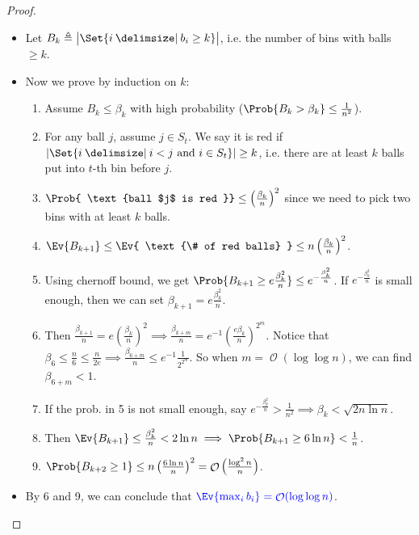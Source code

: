 \documentclass[a4paper]{article}
\DeclarePairedDelimiter{\abs}{\lvert}{\rvert}
\DeclareMathOperator{\Ord}{\mathcal{O}}
\providecommand\given{}
\newcommand*\SetSymbol[1][]{%
  \nonscript\:#1\vert
  \allowbreak
  \nonscript\:
\mathopen{}}
\renewcommand\given{\SetSymbol[\delimsize]}
\renewcommand\given{\SetSymbol[\delimsize]}
\theoremstyle{mystyle}
\begin{document}
\begin{proof} \mbox{}
  \begin{itemize}
    \item Let $B_k \triangleq \abs[\big ]{\Set{ i \given b_i \ge k }}$,
      i.e. the number of bins with balls $\ge k$.
    \item Now we prove by induction on $k$:
      \begin{enumerate}
        \item Assume $B_k \le \beta_k$ with high probability
          ($\Prob{B_k > \beta_k} \le \frac{1}{n^2}$).
        \item For any ball $j$, assume $j \in S_t$. We say it is red if
          $\abs{\Set{ i \given i < j \text{ and } i \in S_t}} \ge k$,
          i.e. there are at least $k$ balls put into $t$-th bin before $j$.
        \item $\Prob{ \text{ball $j$ is red }} \le \left(\frac{\beta_k}{n}\right)^2$
          since we need to pick two bins with at least $k$ balls.
        \item $\Ev{B_{k+1}} \le \Ev{ \text{\# of red balls} } \le
          n\left(\frac{\beta_k}{n}\right)^2$.
        \item Using chernoff bound, we get
          $\Prob{B_{k+1} \ge e\frac{\beta_k^2}{n}} \le e^{-\frac{\beta_k^2}{n}}$.
          If $e^{-\frac{\beta_k^2}{n}}$ is small enough, then we can set
          $\beta_{k+1} = e\frac{\beta_k^2}{n}$.
        \item Then $\frac{\beta_{k+1}}{n} = e\left(\frac{\beta_k}{n}\right)^2
          \implies \frac{\beta_{k+m}}{n} = e^{-1} \left(\frac{e\beta_k}{n}\right)^{2^m}$.
          Notice that $\beta_6 \le \frac{n}{6} \le \frac{n}{2e}
          \implies \frac{\beta_{6+m}}{n} \le e^{-1} \frac{1}{2^{2^m}}$.
          So when $m = \Ord(\log \log n)$, we can find $\beta_{6+m} < 1$.
        \item If the prob. in 5 is not small enough, say
          $e^{-\frac{\beta_k^2}{n}} > \frac{1}{n^2} \implies \beta_k < \sqrt{2n \ln n}$.
        \item Then $\Ev{B_{k+1}} \le \frac{\beta_k^2}{n} < 2 \ln n
          \implies \Prob{B_{k+1} \ge 6 \ln n} < \frac{1}{n}$.
        \item $\Prob{B_{k+2} \ge 1} \le n \left(\frac{6 \ln n}{n}\right)^2
          = \Ord\left(\frac{\log^2 n}{n}\right)$.
      \end{enumerate}
    \item By 6 and 9, we can conclude that 
      ${\color{blue} \Ev{ \max_i b_i } = \Ord(\log \log n)}$.
      \qedhere
  \end{itemize}
\end{proof}
\end{document}
